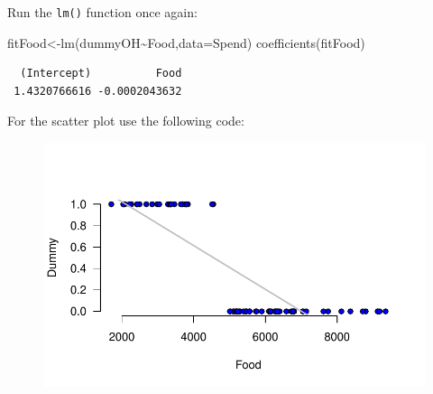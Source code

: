 \documentclass[
  letterpaper,
  DIV=11,
  numbers=noendperiod]{scrreprt}
\newenvironment{Shaded}{\begin{snugshade}}{\end{snugshade}}
\newcommand{\AttributeTok}[1]{\textcolor[rgb]{0.40,0.45,0.13}{#1}}
\newcommand{\ConstantTok}[1]{\textcolor[rgb]{0.56,0.35,0.01}{#1}}
\newcommand{\DecValTok}[1]{\textcolor[rgb]{0.68,0.00,0.00}{#1}}
\newcommand{\FunctionTok}[1]{\textcolor[rgb]{0.28,0.35,0.67}{#1}}
\newcommand{\NormalTok}[1]{\textcolor[rgb]{0.00,0.23,0.31}{#1}}
\newcommand{\OtherTok}[1]{\textcolor[rgb]{0.00,0.23,0.31}{#1}}
\newcommand{\SpecialCharTok}[1]{\textcolor[rgb]{0.37,0.37,0.37}{#1}}
\newcommand{\StringTok}[1]{\textcolor[rgb]{0.13,0.47,0.30}{#1}}
\begin{document}
Run the \texttt{lm()} function once again:

\begin{Shaded}
\begin{Highlighting}[numbers=left,,]
\NormalTok{fitFood}\OtherTok{\textless{}{-}}\FunctionTok{lm}\NormalTok{(dummyOH}\SpecialCharTok{\textasciitilde{}}\NormalTok{Food,}\AttributeTok{data=}\NormalTok{Spend)}
\FunctionTok{coefficients}\NormalTok{(fitFood)}
\end{Highlighting}
\end{Shaded}

\begin{verbatim}
  (Intercept)          Food 
 1.4320766616 -0.0002043632 
\end{verbatim}

For the scatter plot use the following code:

\begin{Shaded}
\end{Shaded}

\begin{figure}[H]

{\centering \includegraphics{./08-RegressionII_files/figure-pdf/unnamed-chunk-23-1.pdf}

}

\end{figure}
\end{document}
